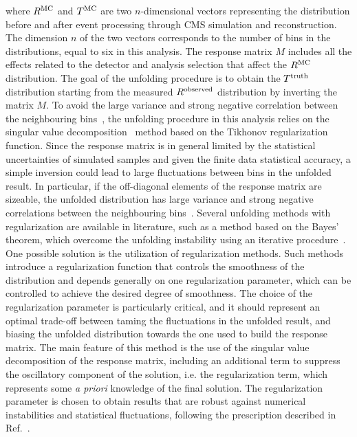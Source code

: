 where $R^{\rm{MC}}$ and $T^{\rm{MC}}$ are two $n$-dimensional vectors
representing the distribution before and after event processing through CMS
simulation and reconstruction. The dimension $n$ of the two vectors corresponds 
to the number of bins in the distributions, equal to six in this analysis.
The response matrix $M$ includes all the effects related to the detector and analysis selection that affect the $R^{\rm{MC}}$ distribution.
The goal of the unfolding procedure is to obtain the $T^{\rm{truth}}$ distribution starting from the measured
$R^{\rm{observed}}$ distribution by inverting the matrix $M$.
To avoid the large variance and strong negative correlation between the neighbouring bins~\cite{Cowan:2002in}, the unfolding procedure in this analysis relies on the singular value decomposition~\cite{Hocker:1995kb} method based on the Tikhonov regularization
function.
Since the response matrix is in general limited by the statistical uncertainties of simulated samples and given the finite data statistical accuracy, a simple inversion could lead to large fluctuations between bins in the unfolded result. In particular, if the off-diagonal elements
of the response matrix are sizeable, the unfolded distribution has large variance and 
strong negative correlations between the neighbouring bins~\cite{Cowan:2002in}.
Several unfolding methods with regularization are available in literature, such as a method based on the Bayes' theorem, which overcome 
the unfolding instability using an iterative procedure~\cite{D'Agostini:1994zf}.
One possible solution is the utilization of regularization methods.
Such methods introduce a regularization function that controls the smoothness of the distribution 
and depends generally on one regularization parameter, which can be controlled
to achieve the desired degree of smoothness.
The choice of the regularization parameter is particularly critical, and it
should represent an optimal trade-off between taming the fluctuations in the
unfolded result, and biasing the unfolded distribution towards the one used to
build the response matrix. 
The main feature of this method is the use of the singular value decomposition of the response matrix, including an additional term to suppress the oscillatory component of the solution, i.e. the regularization term, which represents some \textit{a priori} knowledge of the final solution.
The regularization parameter is chosen to obtain results that are robust against numerical instabilities and statistical fluctuations, following the prescription described in Ref.~\cite{Hocker:1995kb}.

